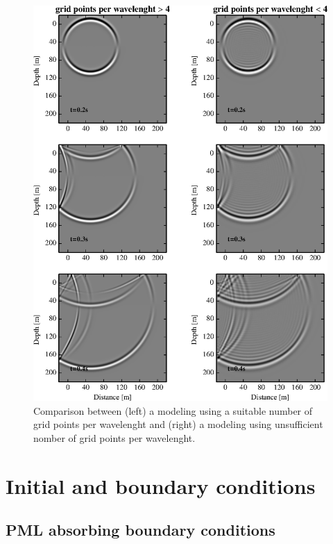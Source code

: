 \documentclass{gnulike}
\begin{document}
\clearpage\newpage
\begin{figure}[!ht]
  \centering
  \includegraphics[scale=1.0]{fig/validation_dispersion.eps}
  \caption{Comparison between (left) a modeling using a suitable number of grid points per wavelenght and (right) a modeling using unsufficient nomber of grid points per wavelenght.}
  \label{fig:dispersion-validation}
\end{figure}

\section{Initial and boundary conditions}

\subsection{PML absorbing boundary conditions}
\end{document}
